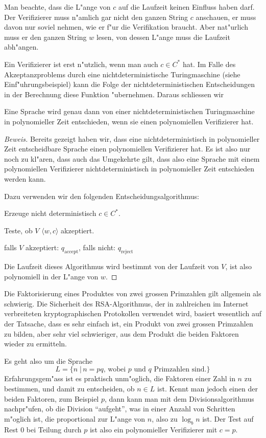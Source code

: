 Man beachte, dass die L"ange von $c$ auf die Laufzeit keinen
Einfluss haben darf. Der Verifizierer muss n"amlich gar nicht
den ganzen String $c$ anschauen, er muss davon nur soviel
nehmen, wie er f"ur die Verifikation braucht. Aber nat"urlich
muss er den ganzen String $w$ lesen, von dessen L"ange muss
die Laufzeit abh"angen.

Ein Verifizierer ist erst n"utzlich, wenn man auch $c\in C^*$
hat. Im Falle des Akzeptanzproblems durch eine nichtdeterministische
Turingmaschine (siehe Einf"uhrungsbeispiel) kann die Folge der
nichtdeterministischen Entscheidungen in der Berechnung diese
Funktion "ubernehmen. Daraus schliessen wir

\begin{satz} Eine Sprache wird genau dann von einer
nichtdeterministischen Turingmaschine in polynomieller Zeit entschieden,
wenn sie einen polynomiellen Verifizierer hat.
\end{satz}

\begin{proof}[Beweis]
Bereits gezeigt haben wir, dass eine nichtdeterministisch in
polynomieller Zeit entscheidbare Sprache einen polynomiellen Verifizierer hat.
Es ist also
nur noch zu kl"aren, dass auch das Umgekehrte gilt, dass also eine
Sprache mit einem polynomiellen Verifizierer nichtdeterministisch
in polynomieller Zeit entschieden werden kann.

Dazu verwenden wir den folgenden Entscheidungsalgorithmus:
\begin{compactenum}
\item Erzeuge nicht deterministisch $c\in C^*$.
\item Teste, ob $V$ $\langle w,c\rangle$ akzeptiert.
\item falls $V$ akzeptiert: $q_{\text{accept}}$, falls nicht:
$q_{\text{reject}}$
\end{compactenum}
Die Laufzeit dieses Algorithmus wird bestimmt von der Laufzeit von $V$,
ist also polynomiell in der L"ange von $w$.
\end{proof}

\begin{beispiel}[Faktorisierung]
Die Faktorisierung eines Produktes von zwei grossen Primzahlen
gilt allgemein als schwierig. Die Sicherheit des RSA-Algorithmus,
der in zahlreichen im Internet verbreiteten kryptographischen
Protokollen verwendet wird, basiert wesentlich auf der Tatsache, dass
es sehr einfach ist, ein Produkt von zwei grossen Primzahlen zu
bilden, aber sehr viel schwieriger, aus dem Produkt die beiden
Faktoren wieder zu ermitteln.

Es geht also um die Sprache
\[
L
=
\{
n\;|\,\text{$n=pq$, wobei $p$ und $q$ Primzahlen sind}.
\}
\]
Erfahrungsgem"ass ist es praktisch unm"oglich, die Faktoren
einer Zahl in $n$ zu bestimmen, und damit zu entscheiden, ob
$n\in L$ ist. Kennt man jedoch einen der beiden Faktoren,
zum Beispiel $p$, dann kann man mit dem Divisionsalgorithmus
nachpr"ufen, ob die Division ``aufgeht'', was in einer Anzahl
von Schritten m"oglich ist, die proportional zur L"ange von 
$n$, also zu $\log_b n$ ist. Der Test auf Rest 0 bei Teilung
durch $p$ ist also ein polynomieller Verifizierer mit $c=p$.
\end{beispiel}


